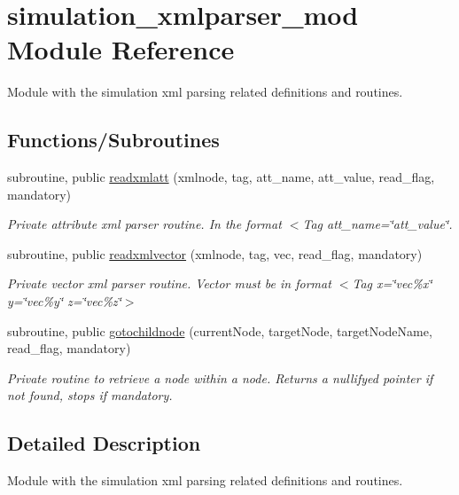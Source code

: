 \hypertarget{namespacesimulation__xmlparser__mod}{}\section{simulation\+\_\+xmlparser\+\_\+mod Module Reference}
\label{namespacesimulation__xmlparser__mod}


Module with the simulation xml parsing related definitions and routines.  


\subsection*{Functions/\+Subroutines}
\begin{DoxyCompactItemize}
\item 
subroutine, public \mbox{\hyperlink{namespacesimulation__xmlparser__mod_ab062c8e064b043446d4f6ac695b306ab}{readxmlatt}} (xmlnode, tag, att\+\_\+name, att\+\_\+value, read\+\_\+flag, mandatory)
\begin{DoxyCompactList}\small\item\em Private attribute xml parser routine. In the format $<$Tag att\+\_\+name=\char`\"{}att\+\_\+value\char`\"{}. \end{DoxyCompactList}\item 
subroutine, public \mbox{\hyperlink{namespacesimulation__xmlparser__mod_a48bcd153bef2149410d66842b564728d}{readxmlvector}} (xmlnode, tag, vec, read\+\_\+flag, mandatory)
\begin{DoxyCompactList}\small\item\em Private vector xml parser routine. Vector must be in format $<$\+Tag x=\char`\"{}vec\%x\char`\"{} y=\char`\"{}vec\%y\char`\"{} z=\char`\"{}vec\%z\char`\"{}$>$ \end{DoxyCompactList}\item 
subroutine, public \mbox{\hyperlink{namespacesimulation__xmlparser__mod_a3167fcb99b40cdc25d2ba18418bd8b9f}{gotochildnode}} (current\+Node, target\+Node, target\+Node\+Name, read\+\_\+flag, mandatory)
\begin{DoxyCompactList}\small\item\em Private routine to retrieve a node within a node. Returns a nullifyed pointer if not found, stops if mandatory. \end{DoxyCompactList}\end{DoxyCompactItemize}


\subsection{Detailed Description}
Module with the simulation xml parsing related definitions and routines. 

